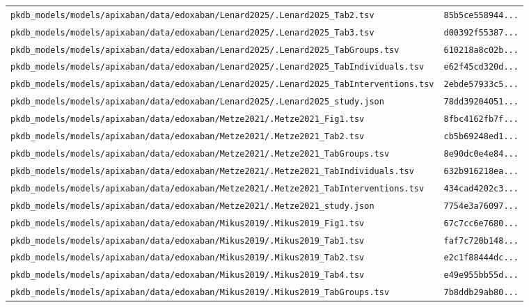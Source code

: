 \documentclass{article}
\begin{document}
\begin{longtable}{ll}
\texttt{pkdb\_models/models/apixaban/data/edoxaban/Lenard2025/.Lenard2025\_Tab2.tsv} & \texttt{85b5ce558944...} \\
\texttt{pkdb\_models/models/apixaban/data/edoxaban/Lenard2025/.Lenard2025\_Tab3.tsv} & \texttt{d00392f55387...} \\
\texttt{pkdb\_models/models/apixaban/data/edoxaban/Lenard2025/.Lenard2025\_TabGroups.tsv} & \texttt{610218a8c02b...} \\
\texttt{pkdb\_models/models/apixaban/data/edoxaban/Lenard2025/.Lenard2025\_TabIndividuals.tsv} & \texttt{e62f45cd320d...} \\
\texttt{pkdb\_models/models/apixaban/data/edoxaban/Lenard2025/.Lenard2025\_TabInterventions.tsv} & \texttt{2ebde57933c5...} \\
\texttt{pkdb\_models/models/apixaban/data/edoxaban/Lenard2025/.Lenard2025\_study.json} & \texttt{78dd39204051...} \\
\texttt{pkdb\_models/models/apixaban/data/edoxaban/Metze2021/.Metze2021\_Fig1.tsv} & \texttt{8fbc4162fb7f...} \\
\texttt{pkdb\_models/models/apixaban/data/edoxaban/Metze2021/.Metze2021\_Tab2.tsv} & \texttt{cb5b69248ed1...} \\
\texttt{pkdb\_models/models/apixaban/data/edoxaban/Metze2021/.Metze2021\_TabGroups.tsv} & \texttt{8e90dc0e4e84...} \\
\texttt{pkdb\_models/models/apixaban/data/edoxaban/Metze2021/.Metze2021\_TabIndividuals.tsv} & \texttt{632b916218ea...} \\
\texttt{pkdb\_models/models/apixaban/data/edoxaban/Metze2021/.Metze2021\_TabInterventions.tsv} & \texttt{434cad4202c3...} \\
\texttt{pkdb\_models/models/apixaban/data/edoxaban/Metze2021/.Metze2021\_study.json} & \texttt{7754e3a76097...} \\
\texttt{pkdb\_models/models/apixaban/data/edoxaban/Mikus2019/.Mikus2019\_Fig1.tsv} & \texttt{67c7cc6e7680...} \\
\texttt{pkdb\_models/models/apixaban/data/edoxaban/Mikus2019/.Mikus2019\_Tab1.tsv} & \texttt{faf7c720b148...} \\
\texttt{pkdb\_models/models/apixaban/data/edoxaban/Mikus2019/.Mikus2019\_Tab2.tsv} & \texttt{e2c1f88444dc...} \\
\texttt{pkdb\_models/models/apixaban/data/edoxaban/Mikus2019/.Mikus2019\_Tab4.tsv} & \texttt{e49e955bb55d...} \\
\texttt{pkdb\_models/models/apixaban/data/edoxaban/Mikus2019/.Mikus2019\_TabGroups.tsv} & \texttt{7b8ddb29ab80...} \\

\end{longtable}
\end{document}
